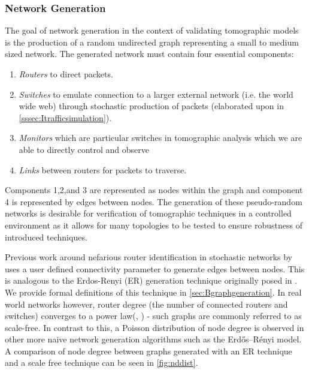 \subsubsection*{Network Generation}
\label{sssec:Inetworkgeneration}

The goal of network generation in the context of validating tomographic models is the production of a random undirected graph representing a small to medium sized network. The generated network must contain four essential components: 
\begin{enumerate}
    \item \textit{Routers} to direct packets.
    \item \textit{Switches} to emulate connection to a larger external network (i.e. the world wide web) through stochastic production of packets (elaborated upon in \cref{sssec:Itrafficsimulation}).
    \item \textit{Monitors} which are particular switches in tomographic analysis which we are able to directly control and observe
    \item \textit{Links} between routers for packets to traverse.
\end{enumerate}
Components 1,2,and 3 are represented as nodes within the graph and component 4 is represented by edges between nodes. The generation of these pseudo-random networks is desirable for verification of tomographic techniques in a controlled environment as it allows for many topologies to be tested to ensure robustness of introduced techniques.\par
Previous work around nefarious router identification in stochastic networks by \cite{barnes_stochastic_2020} uses a user defined connectivity parameter to generate edges between nodes. This is analogous to the Erdos-Renyi (ER) generation technique originally posed in \cite{erdos_random_1959}. We provide formal definitions of this technique in \cref{sec:Bgraphgeneration}. In real world networks however, router degree (the number of connected routers and switches) converges to a power law(\cite{chen_origin_2002}, \cite{zhao_measurement_2020}) - such graphs are commonly referred to as scale-free. In contrast to this, a Poisson distribution of node degree is observed in other more naive network generation algorithms such as the Erdős–Rényi model. A comparison of node degree between graphs generated with an ER technique and a scale free technique can be seen in \ref{fig:nddist}.\par
